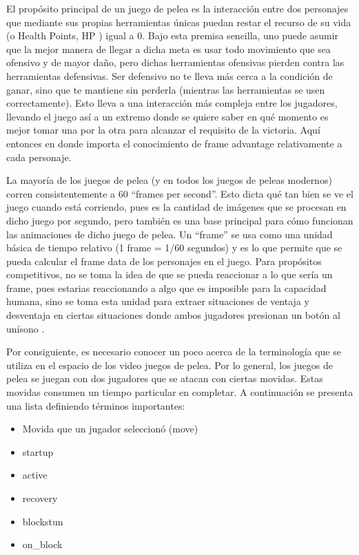 El propósito principal de un juego de pelea es la interacción entre dos personajes que mediante sus propias herramientas únicas puedan restar el recurso de su vida (o Health Points, HP \cite{noauthor_fighting_nodate-2} ) igual a 0. Bajo esta premisa sencilla, uno puede asumir que la mejor manera de llegar a dicha meta es usar todo movimiento que sea ofensivo y de mayor daño, pero dichas herramientas ofensivas pierden contra las herramientas defensivas. Ser defensivo no te lleva más cerca a la condición de ganar, sino que te mantiene sin perderla (mientras las herramientas se usen correctamente). Esto lleva a una interacción más compleja entre los jugadores, llevando el juego así a un extremo donde se quiere saber en qué momento es mejor tomar una por la otra para alcanzar el requisito de la victoria. Aquí entonces en donde importa el conocimiento de frame advantage relativamente a cada personaje. 

La mayoría de los juegos de pelea (y en todos los juegos de peleas modernos) corren consistentemente a 60 “frames per second”. Esto dicta qué tan bien se ve el juego cuando está corriendo, pues es la cantidad de imágenes que se procesan en dicho juego por segundo, pero también es una base principal para cómo funcionan las animaciones de dicho juego de pelea. Un “frame” se usa como una unidad básica de tiempo relativo (1 frame = 1/60 segundos) y es lo que permite que se pueda calcular el frame data de los personajes en el juego. Para propósitos competitivos, no se toma la idea de que se pueda reaccionar a lo que sería un frame, pues estarias reaccionando a algo que es imposible para la capacidad humana, sino se toma esta unidad para extraer situaciones de ventaja y desventaja en ciertas situaciones donde ambos jugadores presionan un botón al unísono \cite{core-a_gaming_analysis_2019}.

Por consiguiente, es necesario conocer un poco acerca de la terminología que se utiliza en el espacio de los video juegos de pelea. Por lo general, los juegos de pelea se juegan con dos jugadores que se atacan con ciertas movidas. Estas movidas consumen un tiempo particular en completar. A continuación se presenta una lista definiendo términos importantes:
\begin{itemize}
    \item Movida que un jugador seleccionó (move)
    \item \gls{startup}
    \item \gls{active}
    \item \gls{recovery}
    \item \gls{blockstun}
    \item \gls{on_block}
\end{itemize}

